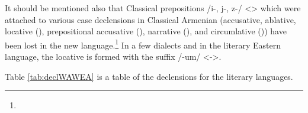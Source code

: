 It should be mentioned also that Classical prepositions /i-, j-, z-/ <> which were attached to various case declensions in Classical Armenian (accusative, ablative, locative (), prepositional accusative (), narrative (), and circumlative ()) have been lost in the new language.\footnote{} In a few dialects and in the literary Eastern language, the locative is formed with the suffix /-um/ <->. 



Table \ref{tab:declWAWEA} is a table of the declensions for the literary languages. 


